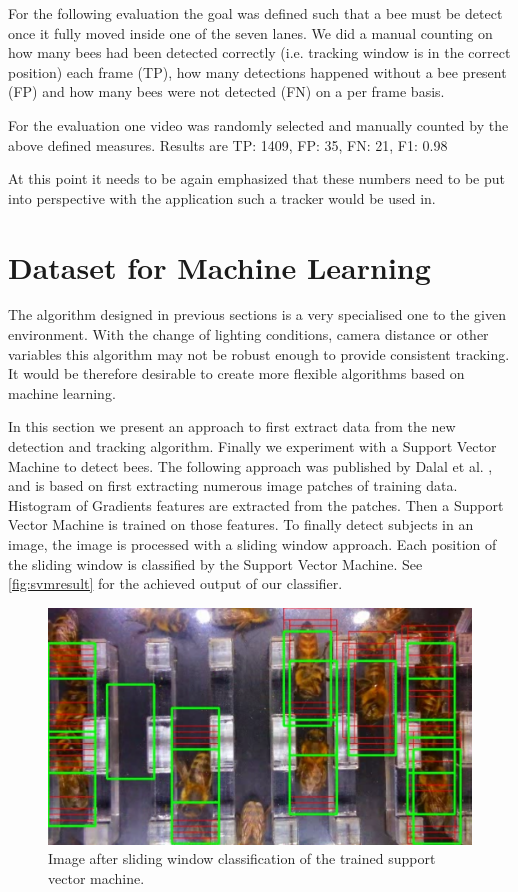 \documentclass[10pt,a4paper]{article}
\begin{document}
For the following evaluation the goal was defined such that a bee must be detect once it fully moved inside one of the seven lanes. We did a manual counting on how many bees had been detected correctly (i.e. tracking window is in the correct position) each frame (TP), how many detections happened without a bee present (FP) and how many bees were not detected (FN) on a per frame basis. 

For the evaluation one video was randomly selected and manually counted by the above defined measures. Results are TP: 1409, FP: 35, FN: 21, F1: 0.98

At this point it needs to be again emphasized that these numbers need to be put into perspective with the application such a tracker would be used in.

\section{Dataset for Machine Learning}
\label{sec:newdataset}
The algorithm designed in previous sections is a very specialised one to the given environment. With the change of lighting conditions, camera distance or other variables this algorithm may not be robust enough to provide consistent tracking. It would be therefore desirable to create more flexible algorithms based on machine learning. 

In this section we present an approach to first extract data from the new detection and tracking algorithm. Finally we experiment with a Support Vector Machine to detect bees. The following approach was published by Dalal et al. \cite{dalal2005histograms}, and is based on first extracting numerous image patches of training data. Histogram of Gradients features are extracted from the patches. Then a Support Vector Machine is trained on those features. To finally detect subjects in an image, the image is processed with a sliding window approach. Each position of the sliding window is classified by the Support Vector Machine. See \ref{fig:svmresult} for the achieved output of our classifier. 

\begin{figure}
\label{fig:preprocessing}
\center
\includegraphics[width=1.0\textwidth]{svmresult}
\caption{Image after sliding window classification of the trained support vector machine.}
\end{figure}
\end{document}
